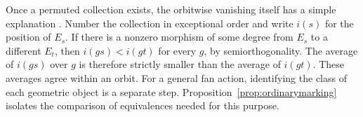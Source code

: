 \documentclass[11pt]{amsart}
\theoremstyle{definition}
\begin{document}
Once a permuted collection exists, the orbitwise vanishing itself has a simple explanation \cite[Lemma~2.12]{BDM}. Number the collection in exceptional order and write $i(s)$ for the position of $E_s$. If there is a nonzero morphism of some degree from $E_s$ to a different $E_t$, then $i(gs)<i(gt)$ for every $g$, by semiorthogonality. The average of $i(gs)$ over $g$ is therefore strictly smaller than the average of $i(gt)$. These averages agree within an orbit. For a general fan action, identifying the class of each geometric object is a separate step. Proposition~\ref{prop:ordinarymarking} isolates the comparison of equivalences needed for this purpose.



























\end{document}
